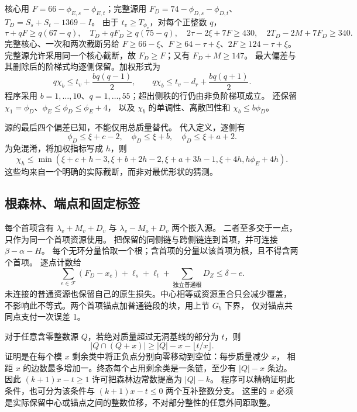 \documentclass[11pt,a4paper]{article}
\begin{document}
核心用 $F=66-\phi_{E,s}-\phi_{E,t}$；完整源用
$F_D=74-\phi_{D,s}-\phi_{D,t}$、$T_D=S_s+S_t-1369-I$。
由于 $t_v\ge T_{\phi_v}$，对每个正整数 $q$，
\[
 \tau+qF\ge q(67-q),\quad T_D+qF_D\ge q(75-q),\quad
 2\tau-2\xi+7F\ge430,\quad2T_D-2M+7F_D\ge340.
\]
完整核心、一次和两次截断另给
$F\ge66-\xi$、$F\ge64-\tau+\xi$、$2F\ge124-\tau+\xi$。
完整源允许采用同一个核心截断，故 $F_D\ge F$；又有 $F_D+M\ge147$。
最大偏差与其删除后的阶梯式均逐侧保留。加权形式为
\[
 q\chi_b\le t_v+\frac{bq(q-1)}2,\qquad
 q\chi_b\le t_v-d_r+\frac{bq(q+1)}2.
\]
程序采用 $b=1,\ldots,10$、$q=1,\ldots,55$；超出侧秩的行仍由非负阶梯项成立。
还保留 $\chi_1=\phi_D$、$\phi_E\le\phi_D\le\phi_E+4$，
以及 $\chi_b$ 的单调性、离散凹性和 $\chi_b\le b\phi_D$。

源的最后四个偏差已知，不能仅用总质量替代。
代入定义，逐侧有
\[
 \phi_D\le\xi+c-2,\quad\phi_D\le\xi+b,\quad\phi_D\le\xi+a+2.
\]
为免混淆，将加权指标写成 $h$，则
\[
 \chi_h\le\min(\xi+c+h-3,\xi+b+2h-2,\xi+a+3h-1,\xi+4h,h\phi_E+4h).
\]
这些均来自一个明确的实际截断，而非对最优形状的猜测。

\subsection{根森林、端点和固定标签}
每个首项含有 $\lambda_v+M_v+D_v$ 与 $\lambda_v-M_o+D_v$ 两个嵌入源。
二者至多交于一点，只作为同一个首项资源使用。
把保留的同侧链与跨侧链连到首项，并可连接 $\beta-\alpha-H$。
每个无环分量恰取一个根；含首项的分量以该首项为根，且不得含两个首项。
逐点计数给
\begin{equation}
 \sum_{e\in\mathcal F}(F_D-x_e)+\ell_s+\ell_t+
 \sum_{\text{独立普通根}}D_Z\le\delta-e.\label{eq:forest}
\end{equation}
未连接的普通资源也保留自己的原生损失。中心相等或资源重合只会减少覆盖，
不影响此不等式。两个首项锚点加普通链段的块，用上节 $G_b$ 下界，
仅对锚点共同点支付一次误差 1。

对于任意含零整数源 $Q$，若绝对质量超过无洞基线的部分为 $t$，则
\begin{equation}
 |Q\cap(Q+x)|\ge |Q|-x-\lfloor t/x\rfloor.\label{eq:compression}
\end{equation}
证明是在每个模 $x$ 剩余类中将正负点分别向零移动到空位：每步质量减少 $x$，
相距 $x$ 的边数最多增加一。终态每个占用剩余类是一条链，至少有 $|Q|-x$ 条边。
因此 $(k+1)x-t\ge1$ 许可把森林边常数提高为 $|Q|-k$。
程序可以精确证明此条件，也可分为该条件与 $(k+1)x-t\le0$ 两个互补整数分支。
这里的 $x$ 必须是实际保留中心或锚点之间的整数位移，不对部分整性的任意外间距取整。
\end{document}
